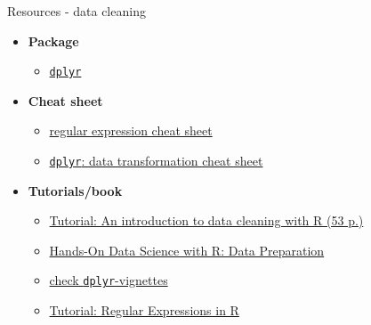 \documentclass[8pt,ignorenonframetext,]{beamer}
\providecommand{\tightlist}{%
  \setlength{\itemsep}{0pt}\setlength{\parskip}{0pt}}
\begin{document}
\begin{frame}[fragile]{Resources - data cleaning}

\begin{itemize}
\tightlist
\item
  \textbf{Package}

  \begin{itemize}
  \tightlist
  \item
    \href{https://cran.r-project.org/web/packages/dplyr/index.html}{\texttt{dplyr}}
  \end{itemize}
\item
  \textbf{Cheat sheet}

  \begin{itemize}
  \tightlist
  \item
    \href{https://www.rstudio.com/wp-content/uploads/2016/09/RegExCheatsheet.pdf}{regular
    expression cheat sheet}
  \item
    \href{https://github.com/rstudio/cheatsheets/raw/master/data-transformation.pdf}{\texttt{dplyr}:
    data transformation cheat sheet}
  \end{itemize}
\item
  \textbf{Tutorials/book}

  \begin{itemize}
  \tightlist
  \item
    \href{https://cran.r-project.org/doc/contrib/de_Jonge+van_der_Loo-Introduction_to_data_cleaning_with_R.pdf}{Tutorial:
    An introduction to data cleaning with R (53 p.)}
  \item
    \href{https://onepager.togaware.com/DataO.pdf}{Hands-On Data Science
    with R: Data Preparation}
  \item
    \href{https://cran.r-project.org/web/packages/dplyr/index.html}{check
    \texttt{dplyr}-vignettes}
  \item
    \href{https://rstudio-pubs-static.s3.amazonaws.com/74603_76cd14d5983f47408fdf0b323550b846.html}{Tutorial:
    Regular Expressions in R}
  \end{itemize}
\end{itemize}

\end{frame}
\end{document}
